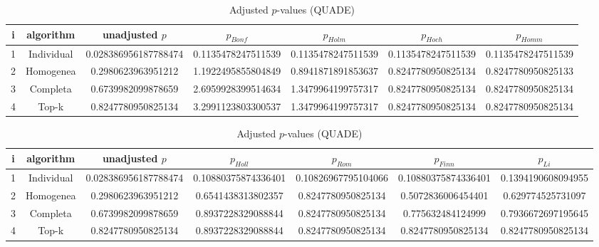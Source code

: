 \documentclass[a4paper,10pt]{article}
\begin{document}
\begin{landscape}
\newpage

\begin{table}[!htp]
\centering\scriptsize
\caption{Adjusted $p$-values (QUADE)}
\begin{tabular}{ccccccc}
i&algorithm&unadjusted $p$&$p_{Bonf}$&$p_{Holm}$&$p_{Hoch}$&$p_{Homm}$\\
\hline
1&Individual&0.028386956187788474&0.1135478247511539&0.1135478247511539&0.1135478247511539&0.1135478247511539\\
2&Homogenea&0.2980623963951212&1.1922495855804849&0.8941871891853637&0.8247780950825134&0.8247780950825133\\
3&Completa&0.6739982099878659&2.6959928399514634&1.3479964199757317&0.8247780950825134&0.8247780950825134\\
4&Top-k&0.8247780950825134&3.2991123803300537&1.3479964199757317&0.8247780950825134&0.8247780950825134\\
\hline
\end{tabular}
\end{table}

\begin{table}[!htp]
\centering\scriptsize
\caption{Adjusted $p$-values (QUADE)}
\begin{tabular}{ccccccc}
i&algorithm&unadjusted $p$&$p_{Holl}$&$p_{Rom}$&$p_{Finn}$&$p_{Li}$\\
\hline
1&Individual&0.028386956187788474&0.10880375874336401&0.10826967795104066&0.10880375874336401&0.1394190608094955\\
2&Homogenea&0.2980623963951212&0.6541438313802357&0.8247780950825134&0.5072836006454401&0.629774525731097\\
3&Completa&0.6739982099878659&0.8937228329088844&0.8247780950825134&0.775632484124999&0.7936672697195645\\
4&Top-k&0.8247780950825134&0.8937228329088844&0.8247780950825134&0.8247780950825134&0.8247780950825134\\
\hline
\end{tabular}
\end{table}

\end{landscape}
\end{document}
